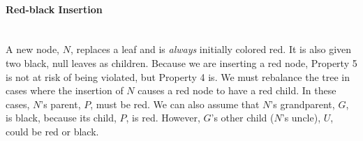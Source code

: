 \paragraph{Red-black Insertion} \hspace*{1mm} \vspace*{2mm} \\
A new node, $N$, replaces a leaf and is \textit{always} initially colored red. It is also given two black, null leaves as children. Because we are inserting a red node, Property 5 is not at risk of being violated, but Property 4 is. We must rebalance the tree in cases where the insertion of $N$ causes a red node to have a red child. In these cases, $N$'s parent, $P$, must be red. We can also assume that $N$'s grandparent, $G$, is black, because its child, $P$, is red. However, $G$'s other child ($N$'s uncle), $U$, could be red or black.

